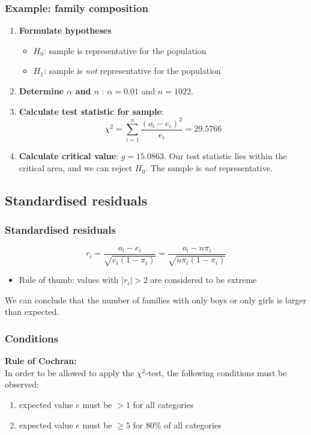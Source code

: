 \documentclass{beamer}
\begin{document}
\begin{frame}
  \frametitle{Example: family composition}
  \begin{enumerate}
  \item \textbf{Formulate hypotheses}
    \begin{itemize}
      \item $H_{0}$: sample is representative for the population
      \item $H_{1}$: sample is \emph{not} representative for the population
    \end{itemize}
  \item \textbf{Determine $\alpha$ and $n$} : $\alpha = 0.01$ and $n = 1022$.
  \item \textbf{Calculate test statistic for sample}:
  \[ \chi^{2} = \sum_{i=1}^{n} \frac{(o_{i} - e_{i})^{2}}{e_{i}} = 29.5766 \]
  \item \textbf{Calculate critical value}: $g = 15.0863$. Our test statistic lies within the critical area, and we can reject $H_{0}$. The sample is \emph{not} representative.
\end{enumerate}
\end{frame}

\subsection{Standardised residuals}
\begin{frame}
  \frametitle{Standardised residuals}
  \[ r_{i} = \frac{o_{i} - e_{i}}{\sqrt{e_{i}(1-\pi_{i})}} = \frac{o_{i} - n \pi_{i}}{\sqrt{n \pi_{i}(1-\pi_{i})}} \]

  \begin{itemize}
    \item Rule of thumb: values with $|r_i| > 2$ are considered to be extreme
  \end{itemize}

  We can conclude that the number of families with only boys or only girls is larger than expected.
\end{frame}

\begin{frame}
  \frametitle{Conditions}
  \textbf{Rule of Cochran:}\\
  In order to be allowed to apply the $\chi^2$-test, the following conditions must be observed: 
  \begin{enumerate}
    \item expected value $e$ must be $>1$ for all categories
    \item expected value $e$ must be $\ge5$ for 80\% of all categories
  \end{enumerate}
\end{frame}
\end{document}
